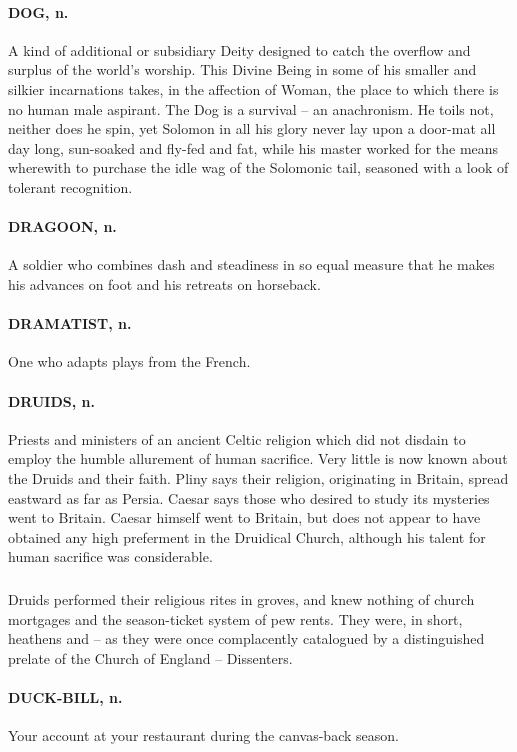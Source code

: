 \documentclass[11pt]{article}
\begin{document}
\paragraph{DOG, n.}  A kind of additional or subsidiary Deity designed to catch
the overflow and surplus of the world's worship.  This Divine Being in
some of his smaller and silkier incarnations takes, in the affection
of Woman, the place to which there is no human male aspirant.  The Dog
is a survival -- an anachronism.  He toils not, neither does he spin,
yet Solomon in all his glory never lay upon a door-mat all day long,
sun-soaked and fly-fed and fat, while his master worked for the means
wherewith to purchase the idle wag of the Solomonic tail, seasoned
with a look of tolerant recognition.

\paragraph{DRAGOON, n.}  A soldier who combines dash and steadiness in so equal
measure that he makes his advances on foot and his retreats on
horseback.

\paragraph{DRAMATIST, n.}  One who adapts plays from the French.

\paragraph{DRUIDS, n.}  Priests and ministers of an ancient Celtic religion which
did not disdain to employ the humble allurement of human sacrifice.
Very little is now known about the Druids and their faith.  Pliny says
their religion, originating in Britain, spread eastward as far as
Persia.  Caesar says those who desired to study its mysteries went to
Britain.  Caesar himself went to Britain, but does not appear to have
obtained any high preferment in the Druidical Church, although his
talent for human sacrifice was considerable.
\subparagraph{}   Druids performed their religious rites in groves, and knew nothing
of church mortgages and the season-ticket system of pew rents.  They
were, in short, heathens and -- as they were once complacently
catalogued by a distinguished prelate of the Church of England --
Dissenters.

\paragraph{DUCK-BILL, n.}  Your account at your restaurant during the canvas-back
season.
\end{document}
